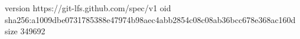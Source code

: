 version https://git-lfs.github.com/spec/v1
oid sha256:a1009dbe0731785388e47974b98aec4abb2854c08c08ab36bcc678e368ac160d
size 349692
